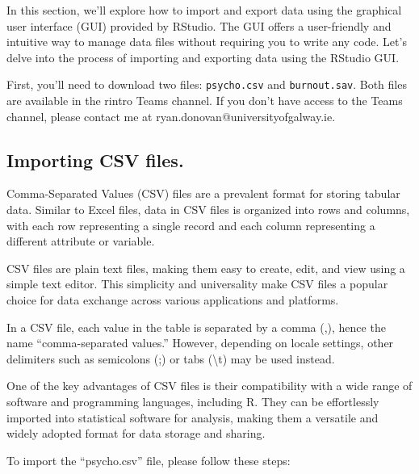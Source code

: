 \documentclass[
]{book}
\begin{document}
In this section, we'll explore how to import and export data using the graphical user interface (GUI) provided by RStudio. The GUI offers a user-friendly and intuitive way to manage data files without requiring you to write any code. Let's delve into the process of importing and exporting data using the RStudio GUI.

First, you'll need to download two files: \texttt{psycho.csv} and \texttt{burnout.sav}. Both files are available in the rintro Teams channel. If you don't have access to the Teams channel, please contact me at ryan.donovan@universityofgalway.ie.

\hypertarget{importing-csv-files.}{%
\subsection{Importing CSV files.}\label{importing-csv-files.}}

Comma-Separated Values (CSV) files are a prevalent format for storing tabular data. Similar to Excel files, data in CSV files is organized into rows and columns, with each row representing a single record and each column representing a different attribute or variable.

CSV files are plain text files, making them easy to create, edit, and view using a simple text editor. This simplicity and universality make CSV files a popular choice for data exchange across various applications and platforms.

In a CSV file, each value in the table is separated by a comma (,), hence the name ``comma-separated values.'' However, depending on locale settings, other delimiters such as semicolons (;) or tabs (\textbackslash t) may be used instead.

One of the key advantages of CSV files is their compatibility with a wide range of software and programming languages, including R. They can be effortlessly imported into statistical software for analysis, making them a versatile and widely adopted format for data storage and sharing.

To import the ``psycho.csv'' file, please follow these steps:
\end{document}
